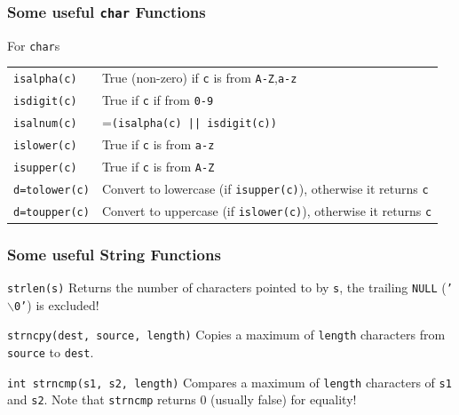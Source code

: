\documentclass[table]{beamer}
\newif\ifschigh\schighfalse
\newcommand{\kt}[1]{\ifschigh\textcolor{red}{#1}\else\textcolor{ctext}{#1}\fi}
\begin{document}
\begin{frame}
\frametitle{Some useful {\tt char} Functions}
\begin{block}{For {\tt char}s}
\begin{tabular}{l p{200pt}}
\tt isalpha(c)&True (non-zero) if {\tt c} is from {\tt A-Z},{\tt a-z}\\
\tt isdigit(c)&True if {\tt c} if from {\tt 0-9}\\
\tt isalnum(c)&={\tt (isalpha(c) || isdigit(c))}\\
\tt islower(c)&True if {\tt c} is from {\tt a-z}\\
\tt isupper(c)&True if {\tt c} is from {\tt A-Z}\\
\tt d=tolower(c)&Convert to lowercase (if {\tt isupper(c)}), otherwise it returns {\tt c}\\
\tt d=toupper(c)&Convert to uppercase (if {\tt islower(c)}), otherwise it returns {\tt c}
\end{tabular}
\end{block}
\end{frame}

\begin{frame}
\frametitle{Some useful String Functions}
\begin{block}{\tt strlen(s)}
Returns the number of characters pointed to by {\tt s}, the trailing {\tt NULL} ({\tt \kt{'$\backslash$0'}}) is excluded!
\end{block}
\begin{block}{\tt strncpy(dest, source, length)}
Copies a maximum of {\tt length} characters from {\tt source} to {\tt dest}.
\end{block}
\begin{block}{\tt int strncmp(s1, s2, length)}
Compares a maximum of {\tt length} characters of {\tt s1} and {\tt s2}. Note that {\tt strncmp} returns 0 (usually false) for equality!
\end{block}
\end{frame}
\end{document}
